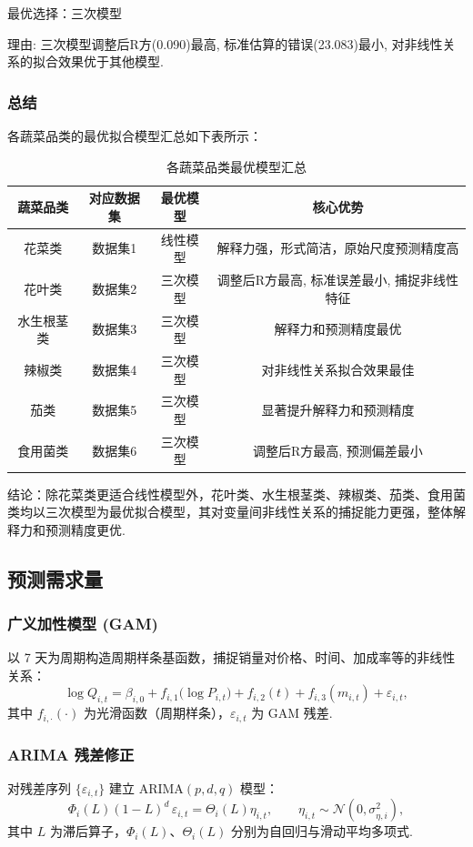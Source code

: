 \documentclass{cumcmthesis}
\begin{document}
最优选择：三次模型

理由: 三次模型调整后R方(0.090)最高, 标准估算的错误(23.083)最小, 对非线性关系的拟合效果优于其他模型. 


\subsubsection{总结}
各蔬菜品类的最优拟合模型汇总如下表所示：

\begin{table}[H]
\centering
\begin{tabular}{cccc}
\hline
蔬菜品类 & 对应数据集 & 最优模型 & 核心优势 \\
\hline
花菜类 & 数据集1 & 线性模型 & 解释力强，形式简洁，原始尺度预测精度高 \\
花叶类 & 数据集2 & 三次模型 & 调整后R方最高, 标准误差最小, 捕捉非线性特征 \\
水生根茎类 & 数据集3 & 三次模型 & 解释力和预测精度最优 \\
辣椒类 & 数据集4 & 三次模型 & 对非线性关系拟合效果最佳 \\
茄类 & 数据集5 & 三次模型 & 显著提升解释力和预测精度 \\
食用菌类 & 数据集6 & 三次模型 & 调整后R方最高, 预测偏差最小 \\
\hline
\end{tabular}
\caption{各蔬菜品类最优模型汇总}
\label{tab:best_models}
\end{table}

结论：除花菜类更适合线性模型外，花叶类、水生根茎类、辣椒类、茄类、食用菌类均以三次模型为最优拟合模型，其对变量间非线性关系的捕捉能力更强，整体解释力和预测精度更优. 

\subsection{预测需求量} 
\subsubsection{广义加性模型 (GAM)} 
以 7 天为周期构造周期样条基函数，捕捉销量对价格、时间、加成率等的非线性关系：
\begin{equation}
\log Q_{i,t} = \beta_{i,0} 
+ f_{i,1}\bigl(\log P_{i,t}\bigr) 
+ f_{i,2}(t) 
+ f_{i,3}(m_{i,t}) 
+ \varepsilon_{i,t},
\label{eq:GAM}
\end{equation}
其中 $f_{i,\cdot}(\cdot)$ 为光滑函数（周期样条），$\varepsilon_{i,t}$ 为 GAM 残差.

\subsubsection{ARIMA 残差修正}
对残差序列 $\{\varepsilon_{i,t}\}$ 建立 ARIMA$(p,d,q)$ 模型：
\begin{equation}
\Phi_i(L)(1-L)^d\,\varepsilon_{i,t} = \Theta_i(L)\eta_{i,t},
\qquad \eta_{i,t}\sim\mathcal{N}(0,\sigma_{\eta,i}^2),
\label{eq:ARIMA}
\end{equation}
其中 $L$ 为滞后算子，$\Phi_i(L)$、$\Theta_i(L)$ 分别为自回归与滑动平均多项式.
\end{document}
